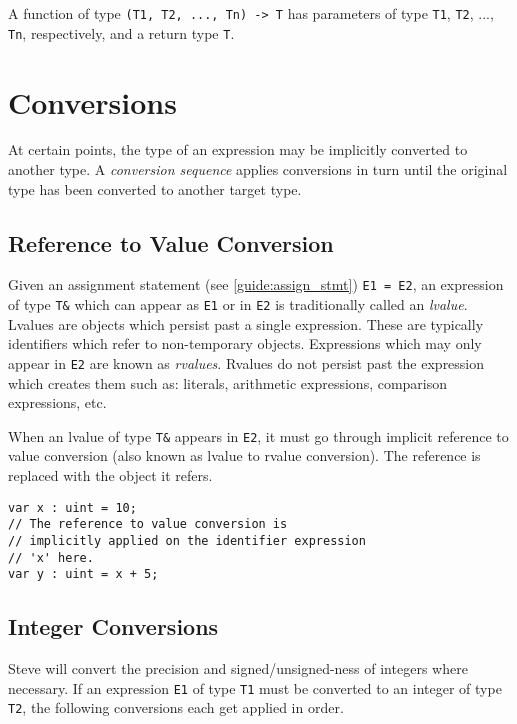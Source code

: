 A function of type \texttt{(T1, T2, ..., Tn) -> T} has parameters of type \texttt{T1}, \texttt{T2}, ..., \texttt{Tn}, respectively, and a return type \texttt{T}.

\section{Conversions} \label{guide:conversions}

At certain points, the type of an expression may be implicitly converted to another type. A \textit{conversion sequence} applies conversions in turn until the original type has been converted to another target type.

\subsection{Reference to Value Conversion} \label{guide:reftoval_conv}

Given an assignment statement (see \ref{guide:assign_stmt}) \texttt{E1 = E2},
an expression of type \texttt{T\&} which can appear as \texttt{E1} or in \texttt{E2} is traditionally called an \textit{lvalue}. Lvalues are objects which persist past a single expression. These are typically identifiers which refer to non-temporary objects. Expressions which may only appear in \texttt{E2} are known as \textit{rvalues}. Rvalues do not persist past the expression which creates them such as: literals, arithmetic expressions, comparison expressions, etc.

When an lvalue of type \texttt{T\&} appears in \texttt{E2}, it must go through implicit reference to value conversion (also known as lvalue to rvalue conversion). The reference is replaced with the object it refers.

\begin{minip}
\begin{lstlisting}
var x : uint = 10;
// The reference to value conversion is
// implicitly applied on the identifier expression
// 'x' here.
var y : uint = x + 5;
\end{lstlisting}
\end{minip}

\subsection{Integer Conversions} \label{guide:int_conv}

Steve will convert the precision and signed/unsigned-ness of integers where necessary. If an expression \texttt{E1} of type \texttt{T1} must be converted to an integer of type \texttt{T2}, the following conversions each get applied in order.

